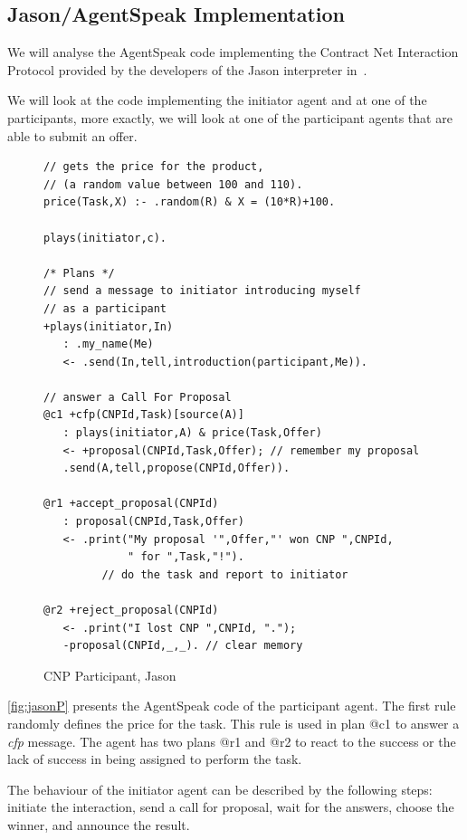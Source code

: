 \documentclass[a4paper,12pt,oneside,fleqn]{book} %
\begin{document}
\subsection{Jason/AgentSpeak Implementation} %
We will analyse the AgentSpeak code implementing the Contract Net
Interaction Protocol provided by the developers of the Jason interpreter
in~\cite{bordini2007programming}.

We will look at the code implementing the initiator agent and at one of the
participants, more exactly, we will look at one of the participant agents
that are able to submit an offer.

\begin{figure}\footnotesize %
\begin{verbatim}
// gets the price for the product,
// (a random value between 100 and 110).
price(Task,X) :- .random(R) & X = (10*R)+100.

plays(initiator,c).

/* Plans */
// send a message to initiator introducing myself
// as a participant
+plays(initiator,In)
   : .my_name(Me)
   <- .send(In,tell,introduction(participant,Me)).

// answer a Call For Proposal
@c1 +cfp(CNPId,Task)[source(A)]
   : plays(initiator,A) & price(Task,Offer)
   <- +proposal(CNPId,Task,Offer); // remember my proposal
   .send(A,tell,propose(CNPId,Offer)).

@r1 +accept_proposal(CNPId)
   : proposal(CNPId,Task,Offer)
   <- .print("My proposal '",Offer,"' won CNP ",CNPId,
             " for ",Task,"!").
         // do the task and report to initiator

@r2 +reject_proposal(CNPId)
   <- .print("I lost CNP ",CNPId, ".");
   -proposal(CNPId,_,_). // clear memory

\end{verbatim}
\caption{CNP Participant, Jason}
\label{fig:jasonP}
\end{figure} %

\autoref{fig:jasonP} presents the AgentSpeak code of the participant agent.
The first rule randomly defines the price for the task. This rule is used
in plan @c1 to answer a \textit{cfp} message. The agent has two plans @r1
and @r2 to react to the success or the lack of success in being assigned to
perform the task.


The behaviour of the initiator agent can be described by the following
steps: initiate the interaction, send a call for proposal, wait for the
answers, choose the winner, and announce the result. 
\end{document}
